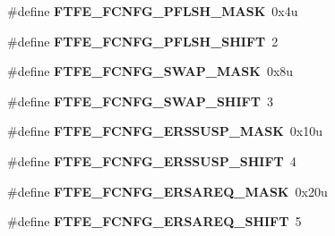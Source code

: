 \begin{DoxyCompactItemize}
\item 
\#define {\bfseries F\+T\+F\+E\+\_\+\+F\+C\+N\+F\+G\+\_\+\+P\+F\+L\+S\+H\+\_\+\+M\+A\+SK}~0x4u\hypertarget{group__FTFE__Register__Masks_ga22150d49ad85cccc858cc662646709fc}{}\label{group__FTFE__Register__Masks_ga22150d49ad85cccc858cc662646709fc}

\item 
\#define {\bfseries F\+T\+F\+E\+\_\+\+F\+C\+N\+F\+G\+\_\+\+P\+F\+L\+S\+H\+\_\+\+S\+H\+I\+FT}~2\hypertarget{group__FTFE__Register__Masks_gab11680c8c2af4bc8ca038d6653aa62f3}{}\label{group__FTFE__Register__Masks_gab11680c8c2af4bc8ca038d6653aa62f3}

\item 
\#define {\bfseries F\+T\+F\+E\+\_\+\+F\+C\+N\+F\+G\+\_\+\+S\+W\+A\+P\+\_\+\+M\+A\+SK}~0x8u\hypertarget{group__FTFE__Register__Masks_ga3c2d728cfbe0780822279facccb6ea7b}{}\label{group__FTFE__Register__Masks_ga3c2d728cfbe0780822279facccb6ea7b}

\item 
\#define {\bfseries F\+T\+F\+E\+\_\+\+F\+C\+N\+F\+G\+\_\+\+S\+W\+A\+P\+\_\+\+S\+H\+I\+FT}~3\hypertarget{group__FTFE__Register__Masks_ga9cbd4373a827c093995738f21d5ec753}{}\label{group__FTFE__Register__Masks_ga9cbd4373a827c093995738f21d5ec753}

\item 
\#define {\bfseries F\+T\+F\+E\+\_\+\+F\+C\+N\+F\+G\+\_\+\+E\+R\+S\+S\+U\+S\+P\+\_\+\+M\+A\+SK}~0x10u\hypertarget{group__FTFE__Register__Masks_ga18ad048f9a72d6d052efabc10f60b3a5}{}\label{group__FTFE__Register__Masks_ga18ad048f9a72d6d052efabc10f60b3a5}

\item 
\#define {\bfseries F\+T\+F\+E\+\_\+\+F\+C\+N\+F\+G\+\_\+\+E\+R\+S\+S\+U\+S\+P\+\_\+\+S\+H\+I\+FT}~4\hypertarget{group__FTFE__Register__Masks_ga14c085de5677c4af68c1bec36d7b78c3}{}\label{group__FTFE__Register__Masks_ga14c085de5677c4af68c1bec36d7b78c3}

\item 
\#define {\bfseries F\+T\+F\+E\+\_\+\+F\+C\+N\+F\+G\+\_\+\+E\+R\+S\+A\+R\+E\+Q\+\_\+\+M\+A\+SK}~0x20u\hypertarget{group__FTFE__Register__Masks_ga821b3e77482bd12d4807f67cceeb214b}{}\label{group__FTFE__Register__Masks_ga821b3e77482bd12d4807f67cceeb214b}

\item 
\#define {\bfseries F\+T\+F\+E\+\_\+\+F\+C\+N\+F\+G\+\_\+\+E\+R\+S\+A\+R\+E\+Q\+\_\+\+S\+H\+I\+FT}~5\hypertarget{group__FTFE__Register__Masks_ga3def3907e314c84b2b3c0490891c8bc4}{}\label{group__FTFE__Register__Masks_ga3def3907e314c84b2b3c0490891c8bc4}


\end{DoxyCompactItemize}
